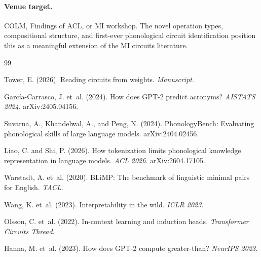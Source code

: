 \documentclass[11pt,a4paper]{article}
\begin{document}
\paragraph{Venue target.}
COLM, Findings of ACL, or MI workshop. The novel operation types,
compositional structure, and first-ever phonological circuit identification
position this as a meaningful extension of the MI circuits literature.


\begin{thebibliography}{99}

Tower, E. (2026). Reading circuits from weights. \textit{Manuscript}.

Garc\'ia-Carrasco, J. et~al. (2024). How does GPT-2 predict acronyms?
  \textit{AISTATS 2024}. arXiv:2405.04156.

Suvarna, A., Khandelwal, A., and Peng, N. (2024). PhonologyBench: Evaluating
  phonological skills of large language models. arXiv:2404.02456.

Liao, C. and Shi, P. (2026). How tokenization limits phonological knowledge
  representation in language models. \textit{ACL 2026}. arXiv:2604.17105.

Warstadt, A. et~al. (2020). BLiMP: The benchmark of linguistic minimal pairs
  for English. \textit{TACL}.

Wang, K. et~al. (2023). Interpretability in the wild. \textit{ICLR 2023}.

Olsson, C. et~al. (2022). In-context learning and induction heads.
  \textit{Transformer Circuits Thread}.

Hanna, M. et~al. (2023). How does GPT-2 compute greater-than?
  \textit{NeurIPS 2023}.

\end{thebibliography}
\end{document}
